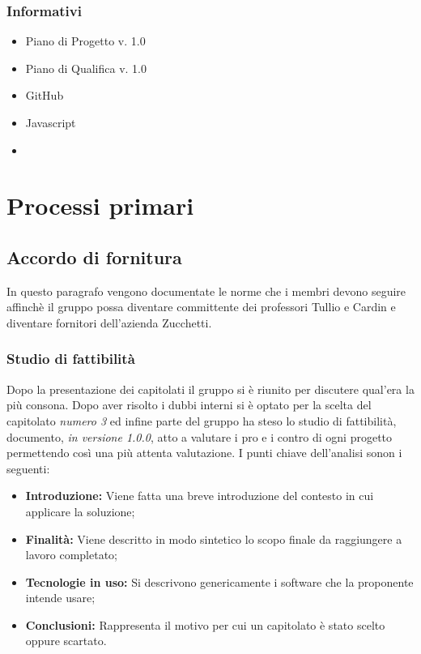\subsubsection{Informativi}
\begin{itemize}
\item Piano di Progetto v. 1.0
\item Piano di Qualifica v. 1.0
\item GitHub
\item Javascript
\item 
\end{itemize}


\newpage

\section{Processi primari}
\subsection{Accordo di fornitura}
In questo paragrafo vengono documentate le norme che i membri devono seguire affinchè il gruppo possa diventare committente dei professori Tullio e Cardin e diventare fornitori dell'azienda Zucchetti.
\subsubsection{Studio di fattibilità}
Dopo la presentazione dei capitolati il gruppo si è riunito per discutere qual'era la più consona. Dopo aver risolto i dubbi interni si è optato per la scelta del capitolato \textit{numero 3} ed infine parte del gruppo ha steso lo studio di fattibilità, documento, \textit{in versione 1.0.0},  atto a valutare i pro e i contro di ogni progetto permettendo così una più attenta valutazione. \newline
I punti chiave dell'analisi sonon i seguenti:
\begin{itemize}
	\item \textbf{Introduzione:} Viene fatta una breve introduzione del contesto in cui applicare la soluzione;
	\item \textbf{Finalità: } Viene descritto in modo sintetico lo scopo finale da raggiungere a lavoro completato;
	\item \textbf{Tecnologie in uso:} Si descrivono genericamente i software che la proponente intende usare;
	\item \textbf{Conclusioni:} Rappresenta il motivo per cui un capitolato è stato scelto oppure scartato.
\end{itemize}
